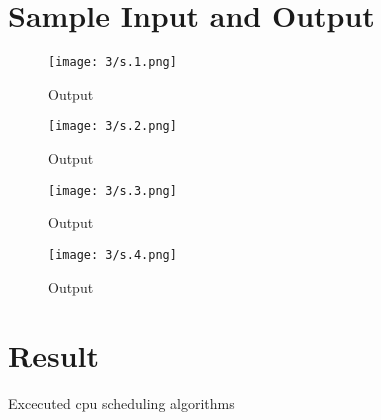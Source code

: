 \documentclass{article}
\begin{document}
\section{Sample Input and Output}
\begin{figure}[H]
    \centering
    \texttt{[image: 3/s.1.png]}
    \caption{Output}
    \label{fig:my_label2}
\end{figure}
\begin{figure}[H]
    \centering
    \texttt{[image: 3/s.2.png]}
    \caption{Output}
    \label{fig:my_label2}
\end{figure}
\begin{figure}[H]
    \centering
    \texttt{[image: 3/s.3.png]}
    \caption{Output}
    \label{fig:my_label2}
\end{figure}
\begin{figure}[H]
    \centering
    \texttt{[image: 3/s.4.png]}
    \caption{Output}
    \label{fig:my_label2}
\end{figure}

\section{\Large Result}
    Excecuted cpu scheduling algorithms
\end{document}
